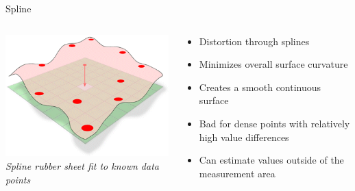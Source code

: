 \begin{frame}{Spline}
\begin{columns}[T] %
	\begin{column}{.44\textwidth}
		\includegraphics[width=.8\linewidth]{../writeup/images/spline.png}\\
		\textit{\footnotesize Spline \ldq{}rubber sheet\rdq{} fit to known data points \cite{albrecht_spline_2005}}
	\end{column}%
	\hfill%
	\begin{column}{.56\textwidth}
		\begin{itemize}
			\item Distortion through splines
			\item Minimizes overall surface curvature
			\item Creates a smooth continuous surface
			\item Bad for dense points with relatively high value differences
			\item Can estimate values outside of the measurement area
		\end{itemize}
	\end{column}%
\end{columns}
\end{frame}
